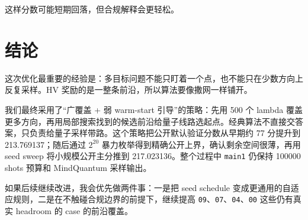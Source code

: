 \documentclass[UTF8,zihao=-4]{ctexart}
\newcommand{\code}[1]{\texttt{#1}}
\begin{document}
这样分数可能短期回落，但合规解释会更轻松。

\section{结论}

这次优化最重要的经验是：多目标问题不能只盯着一个点，也不能只在少数方向上反复采样。HV 奖励的是一整条前沿，所以算法要像撒网一样铺开。

我们最终采用了“广覆盖 + 弱 warm-start 引导”的策略：先用 500 个 lambda 覆盖更多方向，再用局部搜索找到的候选前沿给量子线路选起点。经典算法不直接交答案，只负责给量子采样带路。这个策略把公开默认验证分数从早期约 77 分提升到 213.769137；随后通过 \(2^{20}\) 暴力枚举得到精确公开上界，确认剩余空间很薄，再用 seed sweep 将小规模公开主分推到 217.023136。整个过程中 \code{main1} 仍保持 100000 shots 预算和 MindQuantum 采样输出。

如果后续继续改进，我会优先做两件事：一是把 seed schedule 变成更通用的自适应规则，二是在不触碰合规边界的前提下，继续提高 \code{09}、\code{07}、\code{04}、\code{00} 这些仍有真实 headroom 的 case 的前沿覆盖。
\end{document}
